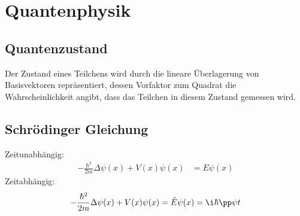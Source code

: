 \documentclass[twocolumn, unnumberedsubsub]{summery}
\begin{document}
\section{Quantenphysik}
\subsection{Quantenzustand}
Der Zustand eines Teilchens wird durch die lineare Überlagerung von Basisvektoren 
repräsentiert, dessen Vorfaktor zum Quadrat die Wahrscheinlichkeit angibt, dass das Teilchen 
in diesem Zustand gemessen wird. 

\subsection{Schrödinger Gleichung}
Zeitunabhängig:
\begin{align*}
    -\frac{\hbar ^2}{2m} \Delta \psi (x) + V(x) \psi(x) &= E\psi(x)
\end{align*}
Zeitabhängig:
\begin{align*}
    -\frac{\hbar ^2}{2m} \Delta \psi (x) + V(x) \psi(x) &= \hat E\psi(x)  = \i\hbar \pp\psi t\\
\end{align*}
\end{document}
